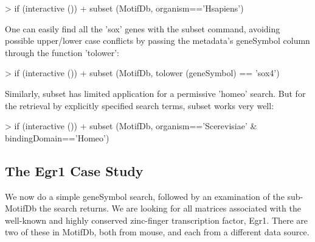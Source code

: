 \documentclass{article}
\renewenvironment{Schunk}{\vspace{\topsep}}{\vspace{\topsep}}
\begin{document}
\begin{Schunk}
\begin{Sinput}
> if (interactive ())
+   subset (MotifDb, organism=='Hsapiens')
\end{Sinput}
\end{Schunk}
One can easily find all the 'sox' genes with the subset command, avoiding possible upper/lower case conflicts by passing
the metadata's geneSymbol column through the function 'tolower':
\begin{Schunk}
\begin{Sinput}
> if (interactive ())
+   subset (MotifDb, tolower (geneSymbol) == 'sox4')
\end{Sinput}
\end{Schunk}
Similarly, subset has limited application for a permissive 'homeo' search.
But for the retrieval by explicitly specified search terms, subset works very well:
\begin{Schunk}
\begin{Sinput}
> if (interactive ())
+   subset (MotifDb, organism=='Scerevisiae' & bindingDomain=='Homeo')
\end{Sinput}
\end{Schunk}

\subsection{The Egr1 Case Study}

We now do a simple geneSymbol search, followed by an examination of the sub-MotifDb the search returns.  We are looking for all matrices
associated with the well-known and highly conserved zinc-finger transcription factor, Egr1.
There are two of these in MotifDb, both from mouse, and each from a different data source.
\end{document}

